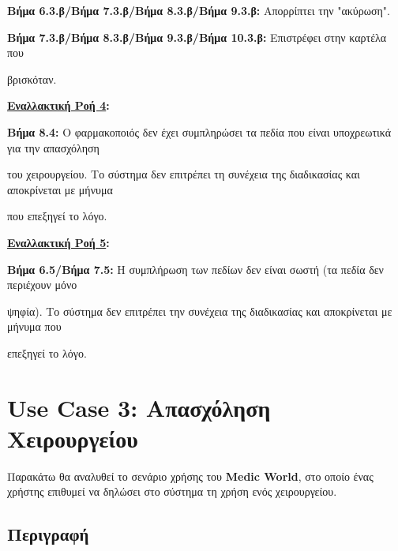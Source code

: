 \documentclass{article}
\begin{document}
\par \textbf{Βήμα 6.3.β/Βήμα 7.3.β/Βήμα 8.3.β/Βήμα 9.3.β:}  Απορρίπτει την "ακύρωση". \vspace{0.1cm}
\par \textbf{Βήμα 7.3.β/Βήμα 8.3.β/Βήμα 9.3.β/Βήμα 10.3.β:} Επιστρέφει στην καρτέλα που \par βρισκόταν. 
\vspace{0.2cm}

\textbf{\underline{Εναλλακτική Ροή 4}:} \vspace{0.2cm} 
\par \textbf{Βήμα 8.4:} Ο φαρμακοποιός δεν έχει συμπληρώσει τα πεδία που είναι υποχρεωτικά για την απασχόληση \par του χειρουργείου. Το σύστημα δεν επιτρέπει τη συνέχεια της διαδικασίας και αποκρίνεται με μήνυμα \par που επεξηγεί το λόγο. \vspace{0.2cm}

\textbf{\underline{Εναλλακτική Ροή 5}:} \vspace{0.2cm} 
\par \textbf{Βήμα 6.5/Βήμα 7.5:} Η συμπλήρωση των πεδίων δεν είναι σωστή (τα πεδία δεν περιέχουν μόνο \par ψηφία). Το σύστημα δεν επιτρέπει την συνέχεια της διαδικασίας και αποκρίνεται με μήνυμα που \par επεξηγεί το λόγο.

 \section{Use Case 3: Απασχόληση Χειρουργείου}
 
 Παρακάτω θα αναλυθεί το σενάριο χρήσης του \textbf{Medic World}, στο οποίο ένας χρήστης επιθυμεί να δηλώσει στο σύστημα τη χρήση ενός χειρουργείου.

\subsection{Περιγραφή}
\end{document}
